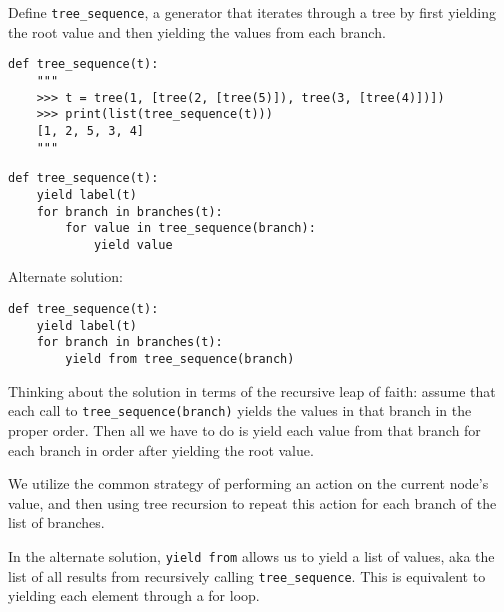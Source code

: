 \begin{blocksection}
\question Define \lstinline$tree_sequence$, a generator that iterates through a tree by first yielding the root value and then yielding the values from each branch.

\begin{lstlisting}
def tree_sequence(t):
    """
    >>> t = tree(1, [tree(2, [tree(5)]), tree(3, [tree(4)])])
    >>> print(list(tree_sequence(t)))
    [1, 2, 5, 3, 4]
    """
\end{lstlisting}

\begin{solution}[1.5in]
\begin{lstlisting}
def tree_sequence(t):
    yield label(t)
    for branch in branches(t):
        for value in tree_sequence(branch):
            yield value
\end{lstlisting}
Alternate solution:
\begin{lstlisting}
def tree_sequence(t):
    yield label(t)
    for branch in branches(t):
        yield from tree_sequence(branch)
\end{lstlisting}
Thinking about the solution in terms of the recursive leap of faith: assume that each call to \lstinline{tree_sequence(branch)} yields the values in that branch in the proper order. Then all we have to do is yield each value from that branch for each branch in order after yielding the root value. 

We utilize the common strategy of performing an action on the current node’s value, and then using tree recursion to repeat this action for each branch of the list of branches.

In the alternate solution, \lstinline{yield from} allows us to yield a list of values, aka the list of all results from recursively calling \lstinline{tree_sequence}. This is equivalent to yielding each element through a for loop.
\end{solution}


\end{blocksection}

